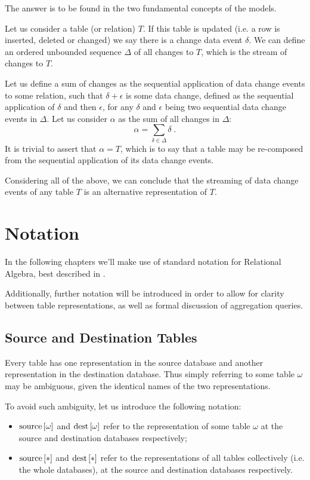 The answer is to be found in the two fundamental concepts of the models.

Let us consider a table (or relation) $T$.
If this table is updated (i.e. a row is inserted, deleted or changed) we say there is a change data event $\delta$.
We can define an ordered unbounded sequence $\Delta$ of all changes to $T$, which is the stream of changes to $T$.

Let us define a sum of changes as the sequential application of data change events to some relation, such that $\delta + \epsilon$ is some data change, defined as the sequential application of $\delta$ and then $\epsilon$, for any $\delta$ and $\epsilon$ being two sequential data change events in $\Delta$.
Let us consider $\alpha$ as the sum of all changes in $\Delta$:
$$
\alpha = \sum_{\delta \in \Delta} \delta \; .
$$
It is trivial to assert that $ \alpha = T $, which is to say that a table may be re-composed from the sequential application of its data change events.

Considering all of the above, we can conclude that the streaming of data change events of any table $ T $ is an alternative representation of $ T $.


\section{Notation}

In the following chapters we'll make use of standard notation for Relational Algebra, best described in \cite[Chapter 4]{dbms}.

Additionally, further notation will be introduced in order to allow for clarity between table representations, as well as formal discussion of aggregation queries.


\subsection{Source and Destination Tables}

Every table has one representation in the source database and another representation in the destination database.
Thus simply referring to some table $\omega$ may be ambiguous, given the identical names of the two representations.

To avoid such ambiguity, let us introduce the following notation:
\begin{itemize}
	\item $\text{source}\left[{\omega}\right]$ and $\text{dest}\left[{\omega}\right]$ refer to the representation of some table $\omega$ at the source and destination databases respectively;
	\item $\text{source}\left[{*}\right]$ and $\text{dest}\left[{*}\right]$ refer to the representations of all tables collectively (i.e. the whole databases), at the source and destination databases respectively.
\end{itemize}

